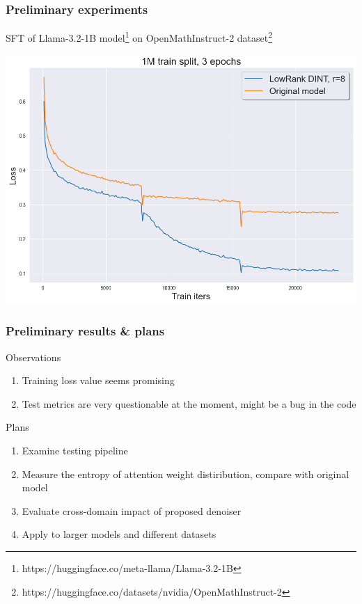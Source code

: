 \documentclass[10pt]{beamer}
\begin{document}
\begin{frame}
    \frametitle{Preliminary experiments}

    SFT of Llama-3.2-1B model\footnote{https://huggingface.co/meta-llama/Llama-3.2-1B} on OpenMathInstruct-2 dataset\footnote{https://huggingface.co/datasets/nvidia/OpenMathInstruct-2}
    \begin{center}
        \includegraphics[scale=0.35]{../images/Loss_1M_3epochs.png}
    \end{center}
        
\end{frame}

\begin{frame}
    \frametitle{Preliminary results \& plans}
    \begin{block}{Observations}
        \begin{enumerate}
            \item Training loss value seems promising
            \item Test metrics are very questionable at the moment, might be a bug in the code
        \end{enumerate}
    \end{block}
    \begin{block}{Plans}
        \begin{enumerate}
            \item Examine testing pipeline
            \item Measure the entropy of attention weight distiribution, compare with original model
            \item Evaluate cross-domain impact of proposed denoiser
            \item Apply to larger models and different datasets
        \end{enumerate}
    \end{block}
\end{frame}
\end{document}
